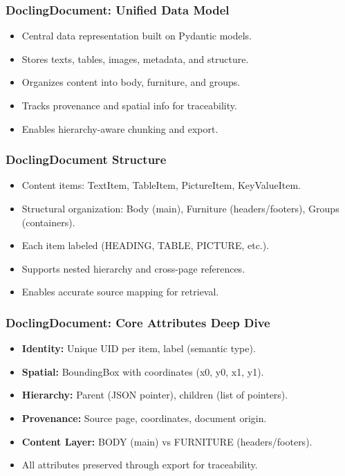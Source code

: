 \begin{frame}[fragile]\frametitle{DoclingDocument: Unified Data Model}
      \begin{itemize}
        \item Central data representation built on Pydantic models.
        \item Stores texts, tables, images, metadata, and structure.
        \item Organizes content into body, furniture, and groups.
        \item Tracks provenance and spatial info for traceability.
        \item Enables hierarchy-aware chunking and export.
      \end{itemize}
\end{frame}

\begin{frame}[fragile]\frametitle{DoclingDocument Structure}
      \begin{itemize}
        \item Content items: TextItem, TableItem, PictureItem, KeyValueItem.
        \item Structural organization: Body (main), Furniture (headers/footers), Groups (containers).
        \item Each item labeled (HEADING, TABLE, PICTURE, etc.).
        \item Supports nested hierarchy and cross-page references.
        \item Enables accurate source mapping for retrieval.
      \end{itemize}
\end{frame}

\begin{frame}[fragile]\frametitle{DoclingDocument: Core Attributes Deep Dive}
      \begin{itemize}
        \item \textbf{Identity:} Unique UID per item, label (semantic type).
        \item \textbf{Spatial:} BoundingBox with coordinates (x0, y0, x1, y1).
        \item \textbf{Hierarchy:} Parent (JSON pointer), children (list of pointers).
        \item \textbf{Provenance:} Source page, coordinates, document origin.
        \item \textbf{Content Layer:} BODY (main) vs FURNITURE (headers/footers).
        \item All attributes preserved through export for traceability.
      \end{itemize}
\end{frame}

